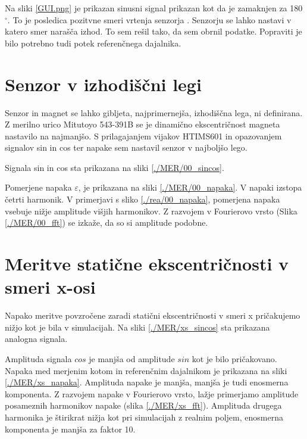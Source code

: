 Na sliki  \ref{GUI.png} je prikazan sinusni signal prikazan kot da je zamaknjen za 180$\mathrm{^\circ}$. To je posledica pozitvne smeri vrtenja senzorja \cite{RM44}. Senzorju se lahko nastavi v katero smer narašča izhod. To sem rešil tako, da sem obrnil podatke. Popraviti je bilo potrebno tudi potek referenčnega dajalnika.




\newpage
\section{Senzor v izhodiščni legi}

Senzor in magnet se lahko gibljeta, najprimernejša, izhodiščna lega, ni definirana. Z merilno urico Mitutoyo 543-391B se je dinamično ekscentričnost magneta nastavilo na najmanjšo.
S prilagajanjem vijakov HTIMS601 in opazovanjem signalov sin in cos ter napake sem nastavil senzor v najboljšo lego.

Signala sin in cos sta prikazana na sliki \ref{./MER/00_sincos}. 



Pomerjene napaka $\varepsilon$, je prikazana na sliki \ref{./MER/00_napaka}.
V napaki izstopa četrti harmonik.
V primerjavi s sliko \ref{./rea/00_napaka}, pomerjena napaka vsebuje nižje amplitude višjih harmonikov.
Z razvojem v Fourierovo vrsto (Slika \ref{./MER/00_fft}) se izkaže, da so si amplitude podobne.


\newpage
\section{Meritve statične ekscentričnosti v smeri x-osi}

Napako meritve povzročene zaradi statični ekscentričnosti v smeri x pričakujemo nižjo kot je bila v simulacijah. Na sliki \ref{./MER/xs_sincos} sta prikazana analogna signala. 


Amplituda signala $cos$ je manjša od amplitude $sin$ kot je bilo pričakovano. Napaka med merjenim kotom in referenčnim dajalnikom je prikazana na sliki \ref{./MER/xs_napaka}. Amplituda napake je manjša, manjša je tudi enosmerna komponenta. Z razvojem napake v Fourierovo vrsto, lažje primerjamo amplitude posameznih harmonikov napake (slika \ref{./MER/xs_fft}). Amplituda drugega harmonika je štirikrat nižja kot pri simulacijah z realnim poljem, enosmerna komponenta je manjša za faktor 10.

